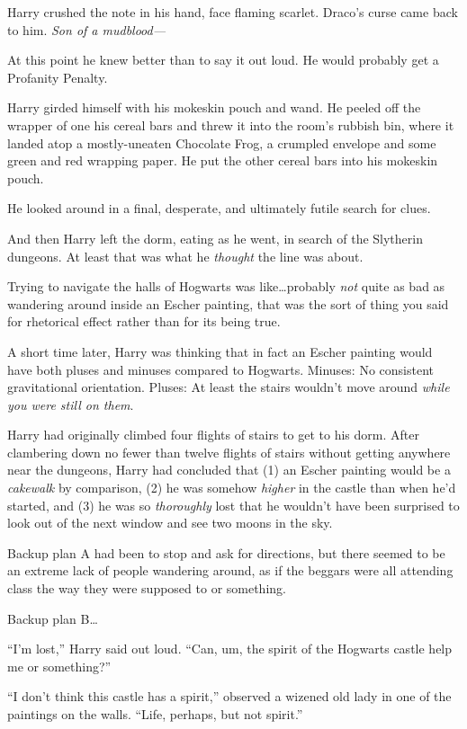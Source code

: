 Harry crushed the note in his hand, face flaming scarlet. Draco’s curse came back to him. \emph{Son of a mudblood—}

At this point he knew better than to say it out loud. He would probably get a Profanity Penalty.

Harry girded himself with his mokeskin pouch and wand. He peeled off the wrapper of one his cereal bars and threw it into the room’s rubbish bin, where it landed atop a mostly-uneaten Chocolate Frog, a crumpled envelope and some green and red wrapping paper. He put the other cereal bars into his mokeskin pouch.

He looked around in a final, desperate, and ultimately futile search for clues.

And then Harry left the dorm, eating as he went, in search of the Slytherin dungeons. At least that was what he \emph{thought} the line was about.

Trying to navigate the halls of Hogwarts was like…probably \emph{not} quite as bad as wandering around inside an Escher painting, that was the sort of thing you said for rhetorical effect rather than for its being true.

A short time later, Harry was thinking that in fact an Escher painting would have both pluses and minuses compared to Hogwarts. Minuses: No consistent gravitational orientation. Pluses: At least the stairs wouldn’t move around \emph{while you were still on them}.

Harry had originally climbed four flights of stairs to get to his dorm. After clambering down no fewer than twelve flights of stairs without getting anywhere near the dungeons, Harry had concluded that (1) an Escher painting would be a \emph{cakewalk} by comparison, (2) he was somehow \emph{higher} in the castle than when he’d started, and (3) he was so \emph{thoroughly} lost that he wouldn’t have been surprised to look out of the next window and see two moons in the sky.

Backup plan A had been to stop and ask for directions, but there seemed to be an extreme lack of people wandering around, as if the beggars were all attending class the way they were supposed to or something.

Backup plan B…

“I’m lost,” Harry said out loud. “Can, um, the spirit of the Hogwarts castle help me or something?”

“I don’t think this castle has a spirit,” observed a wizened old lady in one of the paintings on the walls. “Life, perhaps, but not spirit.”

